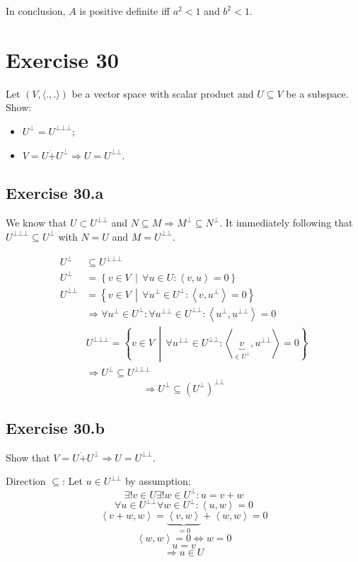 \documentclass[a4paper]{article}
\theoremstyle{definition}
\newcommand\setdef[2]{\left\{#1\,\middle|\,#2\right\}}
\newcommand\fun[1]{\left\langle{#1}\right\rangle}
\begin{document}
In conclusion,
$A$ is positive definite iff $a^2 < 1$ and $b^2 < 1$.

\section{Exercise 30}
\begin{ex}
  Let $(V, \langle ., .\rangle)$ be a vector space with scalar product and
  $U \subseteq V$ be a subspace. Show:
  \begin{itemize}
    \item $U^\bot = U^{\bot \bot \bot}$;
    \item $V = U \dot{+} U^{\bot} \Rightarrow U = U^{\bot\bot}$.
  \end{itemize}
\end{ex}

\subsection{Exercise 30.a}
We know that $U \subset U^{\bot\bot}$ and $N \subseteq M \Rightarrow M^\bot \subseteq N^\bot$.
It immediately following that $U^{\bot\bot\bot} \subseteq U^{\bot}$ with $N = U$ and $M = U^{\bot\bot}$.

\begin{align*}
  U^\bot &\subseteq U^{\bot\bot\bot} \\
  U^\bot &= \setdef{v \in V}{\forall u \in U: \fun{v,u} = 0} \\
  U^{\bot\bot} &= \setdef{v \in V}{\forall u^\bot \in U^\bot: \fun{v,u^\bot} = 0} \\
    &\Rightarrow \forall u^\bot \in U^\bot: \forall u^{\bot\bot} \in U^{\bot\bot}: \fun{u^\bot, u^{\bot\bot}} = 0 \\
    &U^{\bot\bot\bot} = \setdef{v \in V}{\forall u^{\bot\bot} \in U^{\bot\bot}: \fun{\underbrace{v}_{\in U^\bot}, u^{\bot\bot}} = 0} \\
    &\Rightarrow U^\bot \subseteq U^{\bot\bot\bot}
\end{align*}
\[ \Rightarrow U^{\bot} \subseteq (U^\bot)^{\bot\bot} \]

\subsection{Exercise 30.b}
Show that $V = U \dot{+} U^{\bot} \Rightarrow U = U^{\bot\bot}$.

Direction $\subseteq$:
Let $u \in U^{\bot\bot}$ by assumption:
\[ \exists! v \in U \exists ! w \in U^{\bot}: u = v + w \]
\[ \forall u \in U^{\bot\bot} \forall w \in U^{\bot}: \fun{u,w} = 0 \]
\[ \fun{v+w, w} = \underbrace{\fun{v,w}}_{=0} + \fun{w,w} = 0 \]
\[ \fun{w,w} = 0 \Leftrightarrow w = 0 \]
\[ u = v \]
\[ \Rightarrow u \in U \]
\end{document}
